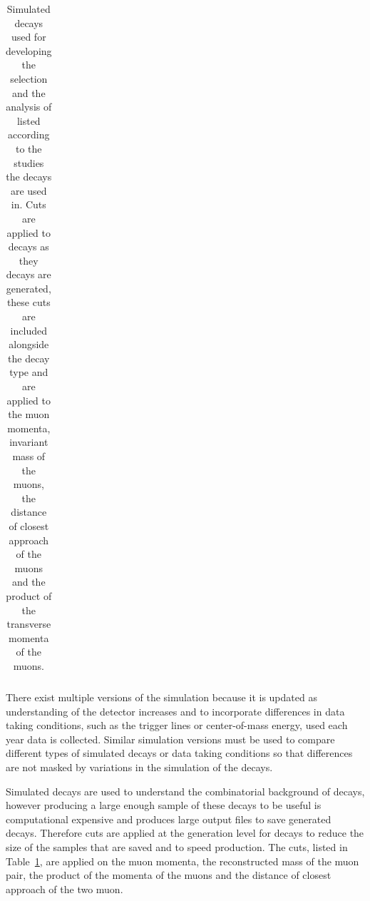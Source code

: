 \begin{table}[htbp]
\begin{center}
\begin{tabular}{p{}p{}p{}p{}}
\end{tabular}
\vspace{0.7cm}
\caption{Simulated decays used for developing the selection and the analysis of \bmumu listed according to the studies the decays are used in. Cuts are applied to \bbbarmumux decays as they decays are generated, these cuts are included alongside the decay type and are applied to the muon momenta, invariant mass of the muons, the distance of closest approach of the muons and the product of the transverse momenta of the muons.}
\label{tab:MC_decays}
\end{center}
\vspace{-1.0cm}
\end{table}

There exist multiple versions of the simulation because it is updated as understanding of the detector increases and to incorporate differences in data taking conditions, such as the trigger lines or center-of-mass energy, used each year  data is collected. Similar simulation versions must be used to compare different types of simulated decays or data taking conditions so that differences are not masked by variations in the simulation of the decays. %

Simulated \bbbarmumux decays are used to understand the combinatorial background of \bmumu decays, however producing a large enough sample of these decays to be useful is computational expensive and produces large output files to save generated decays. Therefore cuts are applied at the generation level for \bbbarmumux decays to reduce the size of the samples that are saved and to speed production. The cuts, listed in Table~\ref{tab:MC_decays}, are applied on the muon momenta, the reconstructed mass of the muon pair, the product of the momenta of the muons and the distance of closest approach of the two muon. %
  

